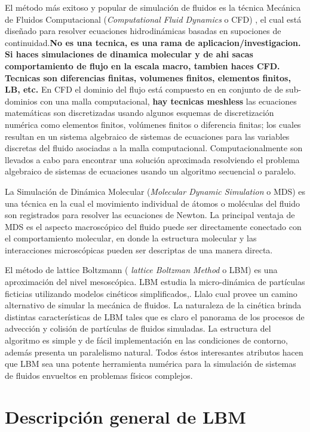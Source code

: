 El método más exitoso y popular de simulación de fluidos es la técnica Mecánica de Fluidos Computacional (\textit{Computational Fluid Dynamics} o CFD) , el cual está diseñado para resolver ecuaciones hidrodinámicas basadas en supociones de continuidad.\textbf{No es una tecnica, es una rama de aplicacion/investigacion. Si haces simulaciones de dinamica molecular y de ahi sacas comportamiento de flujo en la escala macro, tambien haces CFD. Tecnicas son diferencias finitas, volumenes finitos, elementos finitos, LB, etc.}
En CFD el dominio del flujo está compuesto en en conjunto de de sub-dominios con una malla computacional, \textbf{hay tecnicas meshless} las ecuaciones matemáticas son discretizadas usando algunos esquemas de discretización numérica como elementos finitos, volúmenes finitos o diferencia finitas; los cuales resultan en un sistema algebraico de sistemas de ecuaciones para las variables discretas del fluido asociadas a la malla computacional. 
Computacionalmente son llevados a cabo para encontrar una solución aproximada resolviendo el problema algebraico de sistemas de ecuaciones usando un algoritmo secuencial o paralelo.
 
La Simulación de Dinámica Molecular (\textit{Molecular Dynamic Simulation} o MDS) es una técnica en la cual el movimiento individual de átomos o moléculas del fluido son registrados para resolver las ecuaciones de Newton.
La principal ventaja de MDS es el aspecto macroscópico del fluido puede ser directamente conectado con el comportamiento molecular, en donde la estructura molecular y las interacciones microscópicas pueden ser descriptas de una manera directa.

El método de lattice Boltzmann ( \textit{lattice Boltzman Method} o LBM) es una aproximación del nivel mesoscópica. LBM estudia la micro-dinámica de partículas ficticias utilizando modelos cinéticos simplificados,. Llalo cual provee un camino alternativo de simular la mecánica de fluidos. La naturaleza de la cinética brinda distintas características de LBM tales que es claro el panorama de los procesos de advección y colisión de partículas de fluidos simuladas. La estructura del algoritmo es simple y de fácil implementación en las condiciones de contorno, además presenta un paralelismo natural. Todos éstos interesantes atributos hacen que LBM sea una potente herramienta numérica para la simulación de sistemas de fluidos envueltos en problemas físicos complejos\cite{guo2013lattice}. 


\section{Descripción general de LBM}

